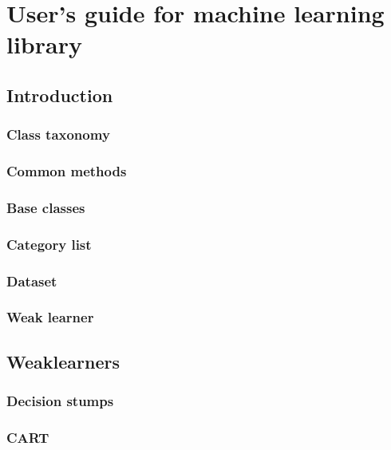 


\chapter{User's guide for machine learning library}

\section{Introduction}

\subsection{Class taxonomy}

\subsection{Common methods}

\subsection{Base classes}

\subsection{Category list}

\subsection{Dataset}

\subsection{Weak learner}

\section{Weaklearners}

\subsection{Decision stumps}

\subsection{CART}

